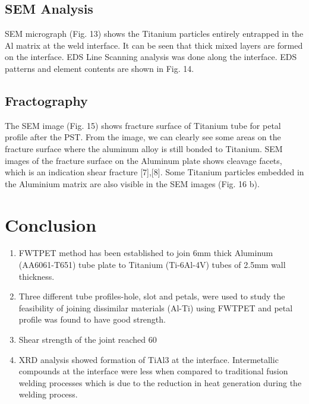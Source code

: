 \documentclass[3p]{elsarticle}
\begin{document}
\subsection{SEM Analysis}
\label{subsec:SEM Analysis}
SEM micrograph (Fig. 13) shows the Titanium particles entirely entrapped in the Al matrix at the weld interface. It can be seen that thick mixed layers are formed on the interface. EDS Line Scanning analysis was done along the interface. EDS patterns and element contents are shown in Fig. 14.

\subsection{Fractography}
\label{subsec:Fractography}
The SEM image (Fig. 15) shows fracture surface of Titanium tube for petal profile after the PST. From the image, we can clearly see some areas on the fracture surface where the aluminum alloy is still bonded to Titanium. SEM images of the fracture surface on the Aluminum plate shows cleavage facets, which is an indication shear fracture [7],[8]. Some Titanium particles embedded in the Aluminium matrix are also visible in
the SEM images (Fig. 16 b).

\section{Conclusion}
\label{sec:Conclusion}
\begin{enumerate}[1.]
\item FWTPET method has been established to join 6mm thick Aluminum (AA6061-T651) tube plate to Titanium (Ti-6Al-4V) tubes of 2.5mm wall thickness.
\item Three different tube profiles-hole, slot and petals, were used to study the feasibility of joining dissimilar materials (Al-Ti) using FWTPET and petal profile was found to have good strength.
\item Shear strength of the joint reached 60%
\item XRD analysis showed formation of TiAl3 at the interface. Intermetallic compounds at the interface were less when compared to traditional fusion welding processes which is due to the reduction in heat generation during the welding process.
\end{enumerate}

\end{document}
